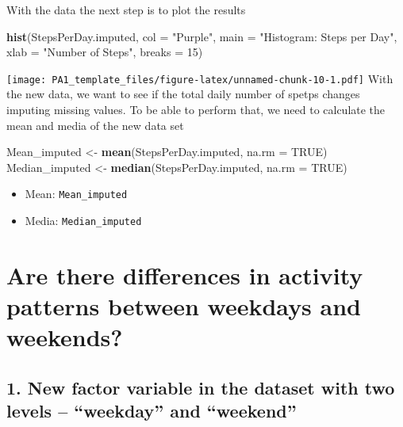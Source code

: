 \documentclass[
]{article}
\newenvironment{Shaded}{\begin{snugshade}}{\end{snugshade}}
\newcommand{\DataTypeTok}[1]{\textcolor[rgb]{0.13,0.29,0.53}{#1}}
\newcommand{\DecValTok}[1]{\textcolor[rgb]{0.00,0.00,0.81}{#1}}
\newcommand{\KeywordTok}[1]{\textcolor[rgb]{0.13,0.29,0.53}{\textbf{#1}}}
\newcommand{\NormalTok}[1]{#1}
\newcommand{\OtherTok}[1]{\textcolor[rgb]{0.56,0.35,0.01}{#1}}
\newcommand{\StringTok}[1]{\textcolor[rgb]{0.31,0.60,0.02}{#1}}
\providecommand{\tightlist}{%
  \setlength{\itemsep}{0pt}\setlength{\parskip}{0pt}}
\begin{document}
With the data the next step is to plot the results

\begin{Shaded}
\begin{Highlighting}[]
\KeywordTok{hist}\NormalTok{(StepsPerDay.imputed,}
     \DataTypeTok{col =} \StringTok{"Purple"}\NormalTok{,}
     \DataTypeTok{main =} \StringTok{"Histogram: Steps per Day"}\NormalTok{,}
     \DataTypeTok{xlab =} \StringTok{"Number of Steps"}\NormalTok{,}
     \DataTypeTok{breaks =} \DecValTok{15}\NormalTok{)}
\end{Highlighting}
\end{Shaded}

\texttt{[image: PA1\_template\_files/figure-latex/unnamed-chunk-10-1.pdf]}
With the new data, we want to see if the total daily number of spetps
changes imputing missing values. To be able to perform that, we need to
calculate the mean and media of the new data set

\begin{Shaded}
\begin{Highlighting}[]
\NormalTok{Mean_imputed <-}\StringTok{ }\KeywordTok{mean}\NormalTok{(StepsPerDay.imputed, }\DataTypeTok{na.rm =} \OtherTok{TRUE}\NormalTok{)}
\NormalTok{Median_imputed <-}\StringTok{ }\KeywordTok{median}\NormalTok{(StepsPerDay.imputed, }\DataTypeTok{na.rm =} \OtherTok{TRUE}\NormalTok{)}
\end{Highlighting}
\end{Shaded}

\begin{itemize}
\tightlist
\item
  Mean: \texttt{Mean\_imputed}
\item
  Media: \texttt{Median\_imputed}
\end{itemize}

\hypertarget{are-there-differences-in-activity-patterns-between-weekdays-and-weekends}{%
\section{Are there differences in activity patterns between weekdays and
weekends?}\label{are-there-differences-in-activity-patterns-between-weekdays-and-weekends}}

\hypertarget{new-factor-variable-in-the-dataset-with-two-levels-weekday-and-weekend}{%
\subsection{1. New factor variable in the dataset with two levels --
``weekday'' and
``weekend''}\label{new-factor-variable-in-the-dataset-with-two-levels-weekday-and-weekend}}
\end{document}
